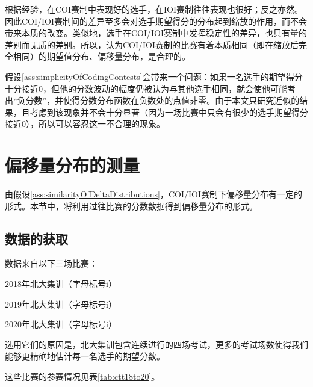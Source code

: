 \begin{asparaenum}
            \item 根据经验，在COI赛制中表现好的选手，在IOI赛制往往表现也很好；反之亦然。因此COI/IOI赛制间的差异至多会对选手期望得分的分布起到缩放的作用，而不会带来本质的改变。类似地，选手在COI/IOI赛制中发挥稳定性的差异，也只有量的差别而无质的差别。所以，认为COI/IOI赛制的比赛有着本质相同（即在缩放后完全相同）的期望值分布、偏移量分布，是合理的。
            \item 假设\ref{ass:simplicityOfCodingContests}会带来一个问题：如果一名选手的期望得分十分接近0，但他的分数波动的幅度仍被认为与其他选手相同，就会使他可能考出“负分数”，并使得分数分布函数在负数处的点值非零。由于本文只研究近似的结果，且考虑到该现象并不会十分显著（因为一场比赛中只会有很少的选手期望得分接近0），所以可以容忍这一不合理的现象。
        \end{asparaenum}

\section{偏移量分布的测量}\label{sec:sec3MeasuringDelta}

    由假设\ref{ass:similarityOfDeltaDistributions}，COI/IOI赛制下偏移量分布有一定的形式。本节中，将利用过往比赛的分数数据得到偏移量分布的形式。

    \subsection{数据的获取}

        数据来自以下三场比赛：
        \begin{asparaitem}
            \item 2018年北大集训（字母标号i）
            \item 2019年北大集训（字母标号i）
            \item 2020年北大集训（字母标号i）
        \end{asparaitem}

        选用它们的原因是，北大集训包含连续进行的四场考试，更多的考试场数使得我们能够更精确地估计每一名选手的期望分数。

        这些比赛的参赛情况见表\ref{tab:ctt18to20}。

        \begin{table}[htbp]
            \centering
            \caption{三场比赛的参赛情况}
            \label{tab:ctt18to20}
        \end{table}

